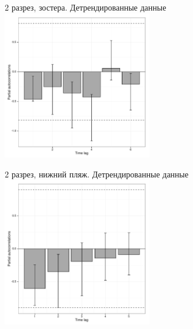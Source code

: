 \documentclass[12pt, a4paper]{disser}
\begin{document}
\begin{figure}[ht]
	\begin{minipage}[b]{.46\linewidth}
	\begin{center}
	{\tiny 2 разрез, зостера. Детрендированные данные}
	\includegraphics[width=65mm]{../White_Sea/dynamic_N_N1/boot_PRCF_razrez2_zostera_zone_detrend.pdf}
	\end{center}
	\end{minipage}
%
	\hfil %
%
	\begin{minipage}[b]{.46\linewidth}
	\begin{center}	
	{\tiny 2 разрез, нижний пляж. Детрендированные данные}
	\includegraphics[width=65mm]{../White_Sea/dynamic_N_N1/boot_PRCF_razrez2_low_beatch_detrend.pdf}
	\end{center}
	\end{minipage}



\end{figure}
\end{document}
